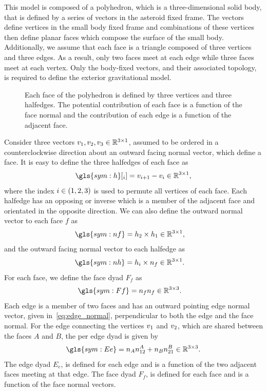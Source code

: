 This model is composed of a \gls{polyhedron}, which is a three-dimensional solid body, that is defined by a series of vectors in the asteroid fixed frame.
The vectors define vertices in the small body fixed frame and combinations of these vertices then define planar faces which compose the surface of the small body.
Additionally, we assume that each face is a triangle composed of three vertices and three edges.
As a result, only two faces meet at each edge while three faces meet at each vertex.
Only the body-fixed vectors, and their associated topology, is required to define the exterior gravitational model.

\begin{figure}[htbp]
    \centering
    
    \caption{Each face of the polyhedron is defined by three vertices and three halfedges.
    The potential contribution of each face is a function of the face normal and the contribution of each edge is a function of the adjacent face.\label{fig:polyhedron_face}}
\end{figure}
Consider three vectors \( v_1, v_2, v_3 \in \mathbb{R}^{3 \times 1} \), assumed to be ordered in a counterclockwise direction about an outward facing normal vector, which define a face.
It is easy to define the three halfedges of each face as
\begin{align}\label{eq:edges}
    \gls{sym:h}[_i] = \vc{v}_{i+1} - \vc{v}_i \in \R^{3 \times 1 },
\end{align}
where the index \( i \in \left( 1,2,3 \right) \) is used to permute all vertices of each face.
Each halfedge has an opposing or inverse which is a member of the adjacent face and orientated in the opposite direction.
We can also define the outward normal vector to each face \( f \) as
\begin{align}\label{eq:face_normal}
    \gls{sym:nf} &= \vc{h}_2 \times \vc{h}_1 \in \R^{3 \times 1},
\end{align}
and the outward facing normal vector to each halfedge as
\begin{align}\label{eq:edge_normal}
    \gls{sym:nh} &=  \vc{h}_i \times \vc{n}_f \in \R^{3 \times 1}.
\end{align}
For each face, we define the face dyad \( F_f \) as
\begin{align}\label{eq:face_dyad}
    \gls{sym:Ff} &= \vc{n}_f \vc{n}_f \in \R^{3 \times 3}.
\end{align}
Each edge is a member of two faces and has an outward pointing edge normal vector, given in~\cref{eq:edge_normal}, perpendicular to both the edge and the face normal.
For the edge connecting the vertices \( v_1 \) and \( v_2 \), which are shared between the faces \(A\) and \( B\), the per edge dyad is given by
\begin{align}\label{eq:edge_dyad}
    \gls{sym:Ee} = \vc{n}_A \vc{n}_{12}^A + \vc{n}_B \vc{n}_{21}^B \in \R^{3 \times 3}.
\end{align}
The edge dyad \( E_e  \), is defined for each edge and is a function of the two adjacent faces meeting at that edge.
The face dyad \( F_f \), is defined for each face and is a function of the face normal vectors.

